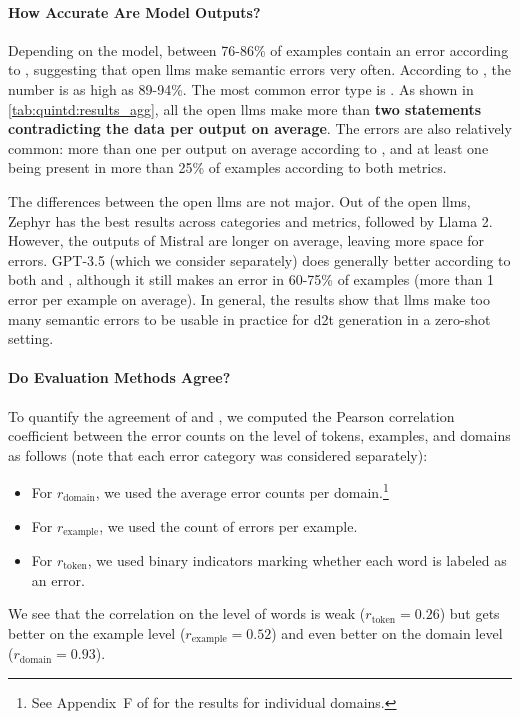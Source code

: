 \paragraph{How Accurate Are Model Outputs?}
Depending on the model, between 76-86\% of examples contain an error according to \humanmetric, suggesting that open \acp{llm} make semantic errors very often. According to \gptmetric, the number is as high as 89-94\%. The most common error type is . As shown in \autoref{tab:quintd:results_agg}, all the open \acp{llm} make more than \textbf{two statements contradicting the data per output on average}. The  errors are also relatively common: more than one per output on average according to \humanmetric, and at least one being present in more than 25\% of examples according to both metrics.

The differences between the open \acp{llm} are not major. Out of the open \acp{llm}, Zephyr has the best results across categories and metrics, followed by Llama 2. However, the outputs of Mistral are longer on average, leaving more space for errors. GPT-3.5 (which we consider separately) does generally better according to both \gptmetric and \humanmetric, although it still makes an error in 60-75\% of examples (more than 1 error per example on average). In general, the results show that \acp{llm} make too many semantic errors to be usable in practice for \ac{d2t} generation in a zero-shot setting.



\paragraph{Do Evaluation Methods Agree?}
To quantify the agreement of \humanmetric{} and \gptmetric{}, we computed the Pearson correlation coefficient between the error counts on the level of tokens, examples, and domains as follows (note that each error category was considered separately):
\begin{itemize}
    \item For $r_{\text{domain}}$, we used the average error counts per domain.\footnote{See Appendix~F of \citet{kasnerReferenceBasedMetricsAnalyzing2024} for the results for individual domains.}
    \item For $r_{\text{example}}$, we used the count of errors per example.
    \item For $r_{\text{token}}$, we used binary indicators marking whether each word is labeled as an error.
\end{itemize}
We see that the correlation on the level of words is weak ($r_{\text{token}}=0.26$) but gets better on the example level ($r_{\text{example}}=0.52$) and even better on the domain level ($r_{\text{domain}}=0.93$).

